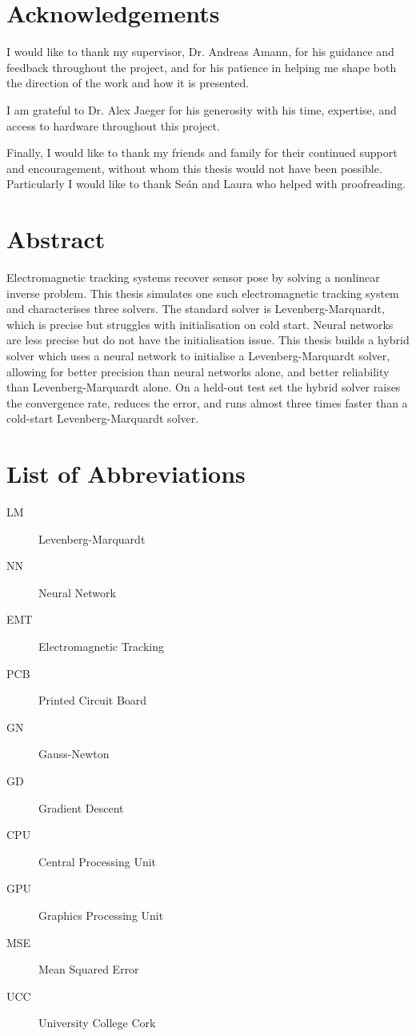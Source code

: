 \documentclass[12pt,a4paper]{report}
\begin{document}
\chapter*{Acknowledgements}

I would like to thank my supervisor, Dr. Andreas Amann, for his guidance and feedback throughout the project, and for his patience in helping me shape both the direction of the work and how it is presented. 

I am grateful to Dr. Alex Jaeger for his generosity with his time, expertise, and access to hardware throughout this project. 

Finally, I would like to thank my friends and family for their continued support and encouragement, without whom this thesis would not have been possible. Particularly I would like to thank Seán and Laura who helped with proofreading.

\chapter*{Abstract}

Electromagnetic tracking systems recover sensor pose by solving a nonlinear inverse problem. This thesis simulates one such electromagnetic tracking system and characterises three solvers. The standard solver is Levenberg-Marquardt, which is precise but struggles with initialisation on cold start. Neural networks are less precise but do not have the initialisation issue. This thesis builds a hybrid solver which uses a neural network to initialise a Levenberg-Marquardt solver, allowing for better precision than neural networks alone, and better reliability than Levenberg-Marquardt alone. On a held-out test set the hybrid solver raises the convergence rate, reduces the error, and runs almost three times faster than a cold-start Levenberg-Marquardt solver. 

\tableofcontents{}

\newpage
\chapter*{List of Abbreviations}
\begin{description}
  \item[LM] Levenberg-Marquardt 
  \item[NN] Neural Network
  \item[EMT] Electromagnetic Tracking
  \item[PCB] Printed Circuit Board
  \item[GN] Gauss-Newton 
  \item[GD] Gradient Descent
  \item[CPU] Central Processing Unit 
  \item[GPU] Graphics Processing Unit 
  \item[MSE] Mean Squared Error
  \item[UCC] University College Cork
\end{description}
\listoffigures{}
\listoftables{}
\newpage 


\newpage


\newpage


\newpage


\newpage 


\newpage



\newpage 
\appendix

\end{document}
